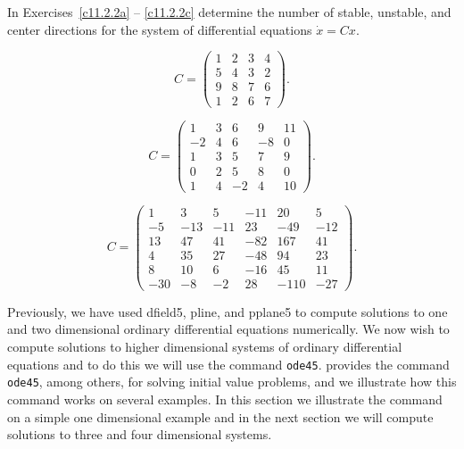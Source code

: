 \noindent In Exercises~\ref{c11.2.2a} -- \ref{c11.2.2c} determine the number
of stable, unstable, and center directions for the system of differential 
equations $\dot{x}=Cx$.
\begin{exercise} \label{c11.2.2a}
\begin{equation*}
C=\left(\begin{array}{rrrr}
     1  &   2   &  3   &  4 \\
     5  &   4   &  3   &  2\\
     9  &   8   &  7   &  6\\
     1  &   2    & 6   &  7
\end{array}\right).
\end{equation*}
\end{exercise}
\begin{exercise} \label{c11.2.2b}
\begin{equation*}
C=\left(\begin{array}{rrrrr}
     1   &  3  &   6   &  9   & 11 \\
    -2   &  4  &   6   & -8   & 0 \\
     1   &  3  &   5   &  7   & 9 \\
     0   &  2  &   5   &  8   &  0 \\
     1   &  4  &  -2   &  4   & 10
\end{array}\right).
\end{equation*}
\end{exercise}
\begin{exercise} \label{c11.2.2c}
\begin{equation*}
C=\left(\begin{array}{rrrrrr}
    1  &  3  &  5  & -11 &  20  &   5 \\
   -5  & -13 & -11 &  23 & -49  & -12 \\
   13  &  47 &  41 & -82 & 167  &  41 \\
    4  &  35 &  27 & -48 &  94  &  23 \\
    8  &  10 &   6 & -16 &  45  &  11 \\
  -30  &  -8 &  -2 &  28 &-110  & -27
\end{array}\right).
\end{equation*}
\end{exercise}





  \label{S:ode45}

Previously, we have used {\sf dfield5}, {\sf pline}, and {\sf pplane5}
to compute solutions to one and two dimensional ordinary differential
equations numerically.  We now wish to compute solutions to higher dimensional
systems of ordinary differential equations and to do this we will use the 
\Matlab command {\tt ode45}.  \Matlab provides the 
command {\tt ode45}, among others, for solving initial value problems, and we 
illustrate how this command works on several examples.  In this section we 
illustrate the command on a simple one dimensional example and in the next
section we will compute solutions to three and four dimensional systems.


